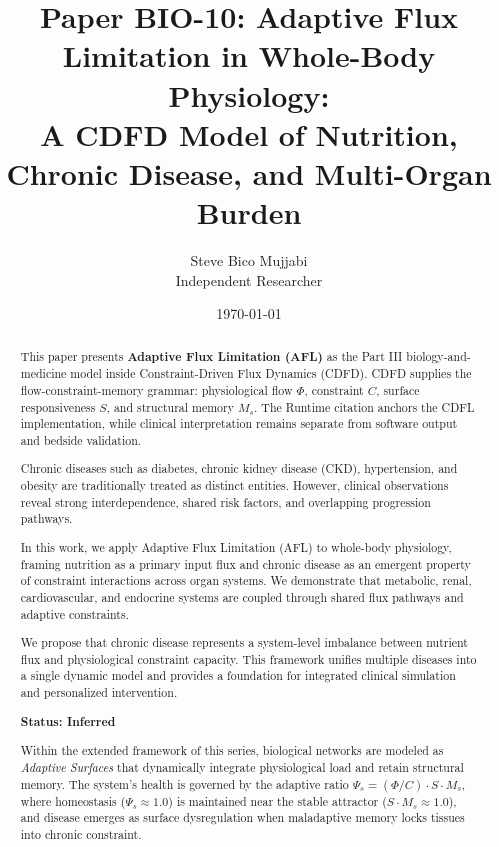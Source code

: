 \documentclass[11pt]{article}
\title{\textbf{Paper BIO-10: Adaptive Flux Limitation in Whole-Body Physiology:\\ A CDFD Model of Nutrition, Chronic Disease, and Multi-Organ Burden}}
\author{Steve Bico Mujjabi\\ \small Independent Researcher}
\date{\today}
\begin{document}
\maketitle

\begin{abstract}

This paper presents \textbf{Adaptive Flux Limitation (AFL)} as the Part III biology-and-medicine model inside Constraint-Driven Flux Dynamics (CDFD). CDFD supplies the flow-constraint-memory grammar: physiological flow $\Phi$, constraint $C$, surface responsiveness $S$, and structural memory $M_s$. The Runtime citation anchors the CDFL implementation, while clinical interpretation remains separate from software output and bedside validation.


Chronic diseases such as diabetes, chronic kidney disease (CKD), hypertension, and obesity are traditionally treated as distinct entities. However, clinical observations reveal strong interdependence, shared risk factors, and overlapping progression pathways.

In this work, we apply Adaptive Flux Limitation (AFL) to whole-body physiology, framing nutrition as a primary input flux and chronic disease as an emergent property of constraint interactions across organ systems. We demonstrate that metabolic, renal, cardiovascular, and endocrine systems are coupled through shared flux pathways and adaptive constraints.

We propose that chronic disease represents a system-level imbalance between nutrient flux and physiological constraint capacity. This framework unifies multiple diseases into a single dynamic model and provides a foundation for integrated clinical simulation and personalized intervention.

\textbf{Status: Inferred}

\medskip
\noindent Within the extended framework of this series, biological networks are modeled as \emph{Adaptive Surfaces} that dynamically integrate physiological load and retain structural memory. The system's health is governed by the adaptive ratio $\Psi_s = (\Phi/C) \cdot S \cdot M_s$, where homeostasis ($\Psi_s \approx 1.0$) is maintained near the stable attractor ($S \cdot M_s \approx 1.0$), and disease emerges as surface dysregulation when maladaptive memory locks tissues into chronic constraint.

\end{abstract}
\end{document}
